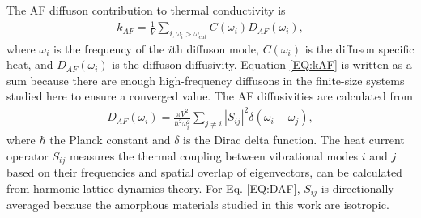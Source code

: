 \documentclass[aps,prb,onecolumn,preprint,superscriptaddress,footinbib,amsmath,amssymb,floatfix]{revtex4}
\begin{document}
The AF diffuson contribution to thermal conductivity is
\cite{feldman_thermal_1993,feldman_numerical_1999}
\begin{equation}\label{EQ:kAF}
\begin{split}
k_{AF} = \frac{1}{V}\sum_{i,\omega_i>\omega_{cut}} 
C(\omega_i) D_{AF}(\omega_i), 
\end{split}
\end{equation}
where $\omega_i$ is the frequency of the $i$th diffuson mode, 
$C(\omega_i)$ is the diffuson specific heat, and $D_{AF}(\omega_i)$ 
is the diffuson diffusivity. Equation \eqref{EQ:kAF} is written as a 
sum because there are enough high-frequency diffusons in the 
finite-size systems studied here to ensure a converged 
value.\cite{feldman_thermal_1993,feldman_numerical_1999} 
The AF diffusivities are calculated from\cite{allen_thermal_1993} 
\begin{equation}\label{EQ:DAF}
\begin{split}
D_{AF}(\omega_i) = \frac{\pi V^2}{\hbar^2\omega^2_i}\sum_{j\neq i}
|S_{ij}|^2 \delta(\omega_i - \omega_j),
\end{split}
\end{equation}
where $\hbar$ the Planck constant and $\delta$ is the Dirac delta 
function. The heat current operator $S_{ij}$ measures the thermal 
coupling 
between vibrational modes $i$ and $j$ based on their frequencies and 
spatial overlap of eigenvectors, 
can be calculated from harmonic lattice dynamics theory.
\cite{allen_thermal_1993,feldman_thermal_1993,feldman_numerical_1999} 
For Eq. \eqref{EQ:DAF}, $S_{ij}$ is directionally averaged because 
the amorphous materials studied in this work are isotropic. 

\end{document}
